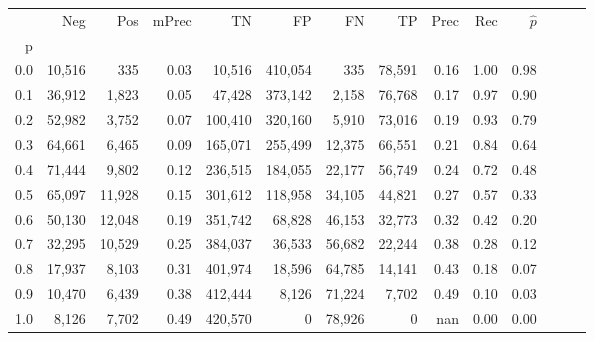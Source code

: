 \begin{tabular}{rrrrrrrrrrrrrr}
\toprule
{} &     Neg &     Pos & mPrec &       TN &       FP &      FN &      TP &  Prec &   Rec & $\hat{p}$ \\
p   &         &         &       &          &          &         &         &       &       &           \\
\midrule
0.0 &  10,516 &     335 &  0.03 &   10,516 &  410,054 &     335 &  78,591 &  0.16 &  1.00 &      0.98 \\
0.1 &  36,912 &   1,823 &  0.05 &   47,428 &  373,142 &   2,158 &  76,768 &  0.17 &  0.97 &      0.90 \\
0.2 &  52,982 &   3,752 &  0.07 &  100,410 &  320,160 &   5,910 &  73,016 &  0.19 &  0.93 &      0.79 \\
0.3 &  64,661 &   6,465 &  0.09 &  165,071 &  255,499 &  12,375 &  66,551 &  0.21 &  0.84 &      0.64 \\
0.4 &  71,444 &   9,802 &  0.12 &  236,515 &  184,055 &  22,177 &  56,749 &  0.24 &  0.72 &      0.48 \\
0.5 &  65,097 &  11,928 &  0.15 &  301,612 &  118,958 &  34,105 &  44,821 &  0.27 &  0.57 &      0.33 \\
0.6 &  50,130 &  12,048 &  0.19 &  351,742 &   68,828 &  46,153 &  32,773 &  0.32 &  0.42 &      0.20 \\
0.7 &  32,295 &  10,529 &  0.25 &  384,037 &   36,533 &  56,682 &  22,244 &  0.38 &  0.28 &      0.12 \\
0.8 &  17,937 &   8,103 &  0.31 &  401,974 &   18,596 &  64,785 &  14,141 &  0.43 &  0.18 &      0.07 \\
0.9 &  10,470 &   6,439 &  0.38 &  412,444 &    8,126 &  71,224 &   7,702 &  0.49 &  0.10 &      0.03 \\
1.0 &   8,126 &   7,702 &  0.49 &  420,570 &        0 &  78,926 &       0 &   nan &  0.00 &      0.00 \\
\bottomrule
\end{tabular}

